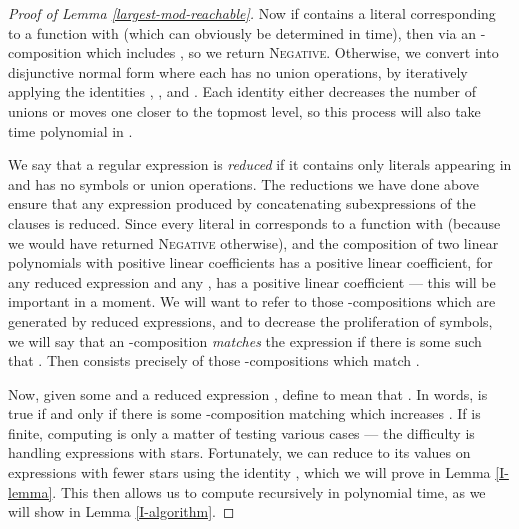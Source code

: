 \documentclass[11pt]{amsart}
\theoremstyle{definition}
\theoremstyle{remark}
\begin{document}
\begin{proof}[Proof of Lemma \ref{largest-mod-reachable}]
Now if  contains a literal corresponding to a function  with  (which can obviously be determined in  time), then  via an -composition which includes , so we return \textsc{Negative}. Otherwise, we convert  into disjunctive normal form  where each  has no union operations, by iteratively applying the identities , , and . Each identity either decreases the number of unions or moves one closer to the topmost level, so this process will also take time polynomial in .

We say that a regular expression  is \emph{reduced} if it contains only literals appearing in  and has no  symbols or union operations. The reductions we have done above ensure that any expression produced by concatenating subexpressions of the clauses  is reduced. Since every literal in  corresponds to a function  with  (because we would have returned \textsc{Negative} otherwise), and the composition of two linear polynomials with positive linear coefficients has a positive linear coefficient, for any reduced expression  and any ,  has a positive linear coefficient --- this will be important in a moment. We will want to refer to those -compositions which are generated by reduced expressions, and to decrease the proliferation of symbols, we will say that an -composition  \emph{matches} the expression  if there is some  such that . Then  consists precisely of those -compositions which match .

Now, given some  and a reduced expression , define  to mean that . In words,  is true if and only if there is some -composition matching  which increases . If  is finite, computing  is only a matter of testing various cases --- the difficulty is handling expressions with stars. Fortunately, we can reduce  to its values on expressions with fewer stars using the identity , which we will prove in Lemma \ref{I-lemma}. This then allows us to compute  recursively in polynomial time, as we will show in Lemma \ref{I-algorithm}.


\end{proof}
\end{document}
